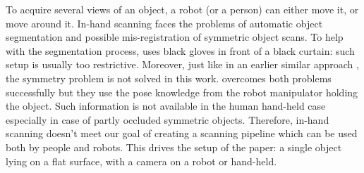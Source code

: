 \documentclass[letterpaper, 10 pt, conference]{ieeeconf}  %
\begin{document}
To acquire several views of an object, a robot (or a person) can either move it, or move around it. In-hand scanning faces the problems
of automatic object segmentation and possible mis-registration of symmetric object scans. To help with the segmentation 
process,
\cite{weise2011online} uses black gloves in front of a black curtain: such setup is usually too restrictive.
Moreover, just like in an earlier similar approach \cite{rusinkiewicz2002real}, the symmetry problem is not solved in this work.
\cite{krainin2011manipulator} overcomes both problems successfully but
they use the pose knowledge from the robot manipulator holding the object.
Such information is not available in the human hand-held case 
especially in case of partly occluded symmetric objects.
Therefore, in-hand scanning doesn't meet our goal of
creating a scanning pipeline which can be used both by people and robots.
This drives the setup of the paper: a single object lying on a flat surface,
with a camera on a robot or hand-held.
\end{document}
